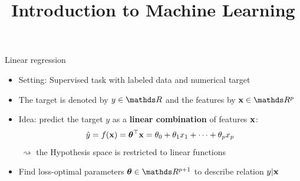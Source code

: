 \documentclass[11pt,compress,t,notes=noshow, xcolor=table]{beamer}
\title{Introduction to Machine Learning}
\institute{\href{https://compstat-lmu.github.io/lecture_i2ml/}{compstat-lmu.github.io/lecture\_i2ml}}
\date{}
\begin{document}



\begin{vbframe}{Linear regression}

\begin{itemize}
    \item Setting: Supervised task with labeled data and numerical target
    \item The target is denoted by $y \in \R$ and the features by $\xv \in \R^p$
    \item Idea: predict the target $y$ as a \textbf{linear combination} of 
    features $\mathbf{x}$:
    $$\hat{y} = f(\mathbf{x}) = \bm{\theta}^\top \mathbf{x} = \theta_0 + \theta_1 x_1 + \dots + \theta_p x_p$$
    $~\rightsquigarrow$ the Hypothesis space is restricted to linear functions
    \item Find loss-optimal parameters $\thetab \in \R^{p+1}$ to describe relation 
    $y | \mathbf{x}$
    

\end{itemize}
\end{vbframe}
\end{document}
